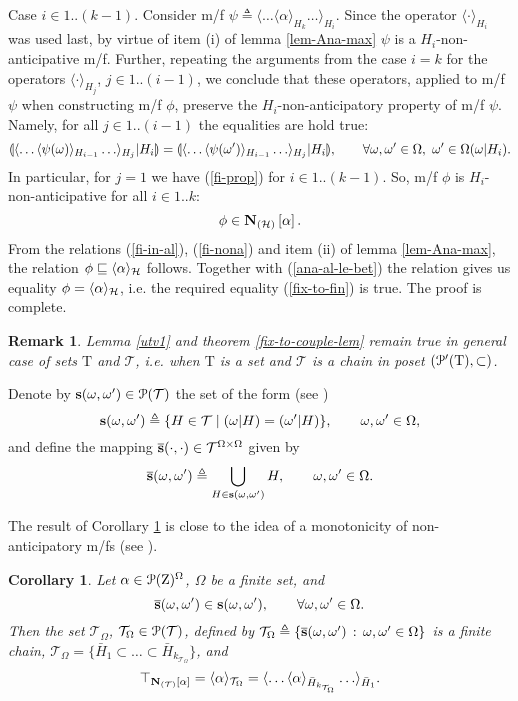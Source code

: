 \documentclass[sn-mathphys,Numbered,pdflatex]{sn-jnl}%
\theoremstyle{thmstyleone}%
\theoremstyle{thmstyletwo}%
\newtheorem{remark}{Remark}%
\theoremstyle{thmstylethree}%
\newtheorem{cor}{Corollary}
\newcommand{\nint}[2]{{{#1}..{#2}}}%
\newcommand{\stmb}[2]{{{\bf\overline{s}}(#1,#2)}}%
\newcommand{\stm}[2]{{{\bf s}(#1,#2)}}%
\newcommand{\beq}{\begin{equation}}
\newcommand{\beqnt}{\begin{equation}\notag}
\newcommand{\eeq}{\end{equation}}
\newcommand{\mydef}{\mathrel{\triangleq}}%
\newcommand{\icP}[1]{\EuScript{P}({#1})}%
\newcommand{\icPp}[1]{\EuScript{P^\prime}({#1})}%
\newcommand{\res}[2]{\ensuremath{(#1|#2)}}%
\newcommand{\myLe}{\mathrel{\sqsubseteq}}%
\newcommand{\naOm}{\ensuremath{\Omega}}%
\newcommand{\naZ}{\ensuremath{\mathrm{Z}}}%
\newcommand{\naT}{\ensuremath{\mathrm{T}}}%
\newcommand{\naTc}{\ensuremath{\mathcal{T}}}%
\newcommand{\naOmo}[2]{\naOm\setbox0=\hbox{\text{$#1$}}\ifdim\wd0=0pt\else\res{#1}{#2}\fi}%
\newcommand{\naN}{\AnaN{\naTc}{}}%
\newcommand{\naNo}[1]{\naN\setbox0=\hbox{\text{$#1$}}\ifdim\wd0=0pt\else[{#1}]\fi}%
\newcommand{\AnaN}[2]{\mathbf{N}_{(#1)}\setbox0=\hbox{\text{$#2$}}\ifdim\wd0=0pt\else\left[{#2}\right]\fi}%
\newcommand{\sres}[2]{\llparenthesis#1|#2\rrparenthesis}%
\newcommand{\Ana}[2]{\ensuremath{\langle{#1}\rangle_{#2}}}%
\newcommand{\fref}[1]{{\rm(\ref{#1})}}   %
\begin{document}
Case $i\in\nint1{(k-1)}$.
Consider m/f $\psi\mydef\Ana{\ldots\Ana{\alpha}{H_k}\ldots}{H_i}$.
Since the operator $\Ana{\cdot}{H_i}$ was used last, by virtue of item (i) of lemma \ref{lem-Ana-max} $\psi$ is a $H_i$-non-anticipative m/f.
Further, repeating the arguments from the case $i=k$ for the operators $\Ana{\cdot}{H_j}$, $j\in\nint1{(i-1)}$, we conclude that these operators, applied to m/f $\psi$ when constructing m/f $\phi$, preserve the $H_i$-non-anticipatory property of m/f $\psi$.
Namely, for all $j\in\nint1{(i-1)}$ the equalities are hold true:
\beqnt%
\sres{\Ana{\ldots\Ana{\psi(\omega)}{H_{i-1}}\ldots}{H_j}}{H_i}=\sres{\Ana{\ldots\Ana{\psi (\omega')}{H_{i-1}}\ldots}{H_j}}{H_i}, \qquad\forall \omega,\omega'\in\naOm,\ \omega'\in\naOmo{\omega}{H_i}.
\eeq
In particular, for $j=1$ we have \fref{fi-prop} for $i\in\nint1{(k-1)}$.
So, m/f $\phi$ is ${H_i}$-non-anticipative for all $i\in\nint1k$:
\beq\label{fi-nona}
\phi\in\AnaN{\cal H}{\alpha}.
\eeq
From the relations \fref{fi-in-al}, \fref{fi-nona} and item (ii) of lemma \ref{lem-Ana-max}, the relation $\phi\myLe\Ana\alpha{\cal H}$ follows.
Together with \fref{ana-al-le-bet} the relation gives us equality $\phi=\Ana\alpha{\cal H}$, i.e. the required equality \fref{fix-to-fin} is true.
The proof is complete.

\bigskip

\begin{remark}
Lemma \ref{utv1} and theorem \ref{fix-to-couple-lem} remain true in general case of sets  $\naT$ and $\naTc$, i.e. when $\naT$ is a set and  $\naTc$ is a chain in poset $(\icPp{\naT},\subset)$.
\end{remark}

\bigskip

Denote by $\stm\omega{\omega'}\in\icP\naTc$  the set of  the form (see \cite[(3.1),(3.6)]{GomSer-UDSU2021})
$$
\stm\omega{\omega'}\mydef\{H\in\naTc\mid\res\omega H=\res{\omega'}H \},\qquad\omega,\omega'\in\naOm,
$$
and define the mapping $\stmb\cdot\cdot\in\naTc^{\naOm\times\naOm}$ given by
$$
\stmb\omega{\omega'}\mydef\bigcup_{H\in\stm\omega{\omega'}}H,\qquad\omega,\omega'\in\naOm.
$$

The result of Corollary \ref{3netrudno} is close to the idea of a monotonicity of non-anticipatory m/fs (see \cite[Remark 2.8]{CARDALIAGUET-PLASKACZ-SIAM2000}).

\begin{cor}\label{3netrudno}
Let $\alpha\in\icP{\naZ}^\naOm$, $\naOm$ be a finite set, and
\beq\label{stnb-in-stm}
\stmb\omega{\omega'}\in\stm\omega{\omega'},\qquad\forall\omega,\omega'\in\naOm.
\eeq
Then the set $\naTc_\naOm$, $\naTc_\naOm\in\icP\naTc$, defined by $\naTc_\naOm\mydef\{\stmb\omega{\omega'}\,:\,\omega,\omega'\in\naOm\}$ is a finite chain, $\naTc_\naOm=\{\bar H_1\subset\ldots\subset\bar H_{k_{\naTc_\naOm}}\}$, and
\beq\label{tAA}
\top_{\naNo\alpha}=\Ana\alpha{\naTc_\naOm}=\Ana{\ldots\Ana\alpha{\bar H_{k_{\naTc_\naOm}}}\ldots}{\bar H_1}.
\eeq
\end{cor}
\end{document}
